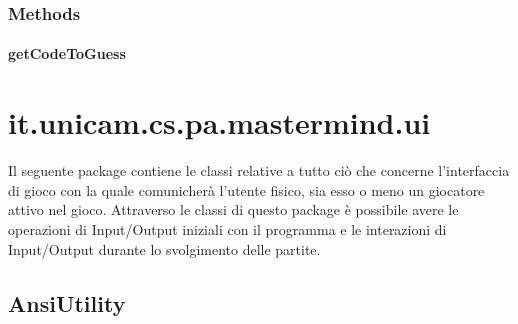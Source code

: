 \documentclass[letterpaper,10pt,italian,openany,oneside]{sphinxmanual}
\begin{document}
\subsubsection{Methods}
\label{\detokenize{test/it/unicam/cs/pa/mastermind/players/RandomBotMaker:methods}}

\paragraph{getCodeToGuess}
\label{\detokenize{test/it/unicam/cs/pa/mastermind/players/RandomBotMaker:getcodetoguess}}

\begin{fulllineitems}
\label{\detokenize{test/it/unicam/cs/pa/mastermind/players/RandomBotMaker:it.unicam.cs.pa.mastermind.players.RandomBotMaker.getCodeToGuess()}}
\end{fulllineitems}



\section{it.unicam.cs.pa.mastermind.ui}
\label{\detokenize{test/it/unicam/cs/pa/mastermind/ui/package-index:it-unicam-cs-pa-mastermind-ui}}\label{\detokenize{test/it/unicam/cs/pa/mastermind/ui/package-index::doc}}
Il seguente package contiene le classi relative a tutto ciò che concerne l’interfaccia di gioco con la quale comunicherà l’utente fisico, sia esso o meno un giocatore attivo nel gioco. Attraverso le classi di questo package è possibile avere le operazioni di Input/Output iniziali con il programma e le interazioni di Input/Output durante lo svolgimento delle partite.

\label{\detokenize{test/it/unicam/cs/pa/mastermind/ui/package-index:package-it.unicam.cs.pa.mastermind.ui}}

\subsection{AnsiUtility}
\label{\detokenize{test/it/unicam/cs/pa/mastermind/ui/AnsiUtility:ansiutility}}\label{\detokenize{test/it/unicam/cs/pa/mastermind/ui/AnsiUtility::doc}}
\end{document}
